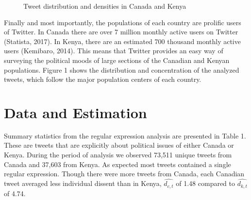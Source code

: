 \documentclass[12pt]{article}
\begin{document}
\begin{spacing}{1.5}
\begin{figure}[htb]
\centering 
{}
\caption{Tweet distribution and densities in Canada and Kenya}
\end{figure}

Finally and most importantly, the populations of each country are prolific users of Twitter. In Canada there are over 7 million monthly active users on Twitter (Statista, 2017). In Kenya, there are an estimated 700 thousand monthly active users (Kemibaro, 2014). This means that Twitter provides an easy way of surveying the political moods of large sections of the Canadian and Kenyan populations. Figure 1 shows the distribution and concentration of the analyzed tweets, which follow the major population centers of each country. 





\section*{Data and Estimation}   

Summary statistics from the regular expression analysis are presented in Table 1. These are tweets that are explicitly about political issues of either Canada or Kenya. During the period of analysis we observed 73,511 unique tweets from Canada and 37,603 from Kenya. As expected most tweets contained a single regular expression. Though there were more tweets from Canada, each Canadian tweet averaged less individual dissent than in Kenya, $\hat{d_{c,t}}$ of 1.48 compared to $\hat{d_{k,t}}$ of 4.74. 


\end{spacing}
\end{document}
